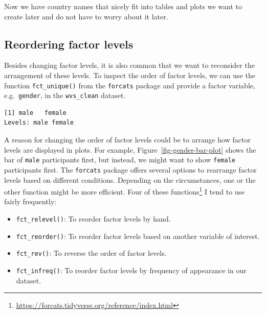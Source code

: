 \documentclass[
  letterpaper,
]{krantz}
\makeatletter
\newenvironment{Shaded}{\begin{snugshade}}{\end{snugshade}}
\newcommand{\FunctionTok}[1]{\textcolor[rgb]{0.28,0.35,0.67}{#1}}
\newcommand{\NormalTok}[1]{\textcolor[rgb]{0.00,0.23,0.31}{#1}}
\newcommand{\SpecialCharTok}[1]{\textcolor[rgb]{0.37,0.37,0.37}{#1}}
\renewcommand{\href}[2]{#2\footnote{\url{#1}}}
\newenvironment{kframe}{%
\medskip{}
\setlength{\fboxsep}{.8em}
 \def\at@end@of@kframe{}%
 \ifinner\ifhmode%
  \def\at@end@of@kframe{\end{minipage}}%
  \begin{minipage}{\columnwidth}%
 \fi\fi%
 \def\FrameCommand##1{\hskip\@totalleftmargin \hskip-\fboxsep
 \colorbox{shadecolor}{##1}\hskip-\fboxsep
     \hskip-\linewidth \hskip-\@totalleftmargin \hskip\columnwidth}%
 \MakeFramed {\advance\hsize-\width
   \@totalleftmargin\z@ \linewidth\hsize
   \@setminipage}}%
 {\par\unskip\endMakeFramed%
 \at@end@of@kframe}
\renewenvironment{Shaded}{\begin{kframe}}{\end{kframe}}
\makeatother
\begin{document}
Now we have country names that nicely fit into tables and plots we want
to create later and do not have to worry about it later.

\subsection{Reordering factor
levels}\label{sec-reordering-factor-levels}

Besides changing factor levels, it is also common that we want to
reconsider the arrangement of these levels. To inspect the order of
factor levels, we can use the function \texttt{fct\_unique()} from the
\texttt{forcats} package and provide a factor variable,
e.g.~\texttt{gender}, in the \texttt{wvs\_clean} dataset.

\begin{Shaded}
\end{Shaded}

\begin{verbatim}
[1] male   female
Levels: male female
\end{verbatim}

A reason for changing the order of factor levels could be to arrange how
factor levels are displayed in plots. For example,
Figure~\ref{fig-gender-bar-plot} shows the bar of \texttt{male}
participants first, but instead, we might want to show \texttt{female}
participants first. The \texttt{forcats} package offers several options
to rearrange factor levels based on different conditions. Depending on
the circumstances, one or the other function might be more efficient.
Four of \href{https://forcats.tidyverse.org/reference/index.html}{these
functions} I tend to use fairly frequently:

\begin{itemize}
\item
  \texttt{fct\_relevel()}: To reorder factor levels by hand.
\item
  \texttt{fct\_reorder()}: To reorder factor levels based on another
  variable of interest.
\item
  \texttt{fct\_rev()}: To reverse the order of factor levels.
\item
  \texttt{fct\_infreq()}: To reorder factor levels by frequency of
  appearance in our dataset.
\end{itemize}
\end{document}
